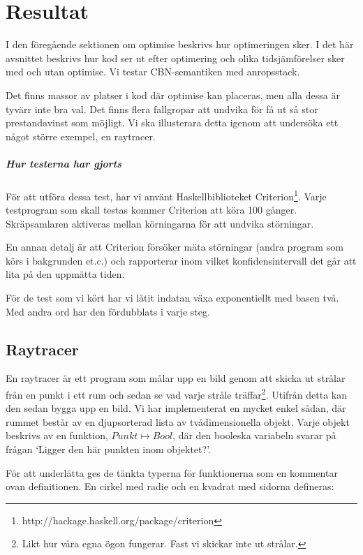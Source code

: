 \documentclass[Rapport]{subfiles}
\begin{document}
\chapter{Resultat}
\label{sec:Resultat}


I den föregående sektionen om optimise beskrivs hur optimeringen sker.
I det här avsnittet beskrivs hur kod ser ut efter optimering och 
olika tidsjämförelser sker med och utan optimise. 
Vi testar CBN-semantiken med anropsstack.

Det finns massor av platser i kod där optimise kan placeras, men alla dessa är tyvärr 
inte bra val. Det finns flera fallgropar att undvika för få ut så stor 
prestandavinst som möjligt. Vi ska illusterara detta igenom att undersöka ett 
något större exempel, en raytracer.

\paragraph{Hur testerna har gjorts}
För att utföra dessa test, har vi använt Haskellbiblioteket Criterion\footnote{http://hackage.haskell.org/package/criterion}.
Varje testprogram som skall testas kommer Criterion att köra 100 gånger. Skräpsamlaren
aktiveras mellan körningarna för att undvika störningar.

En annan detalj är att Criterion försöker mäta störningar (andra program som körs
i bakgrunden et.c.) och rapporterar inom vilket konfidensintervall det går att lita
på den uppmätta tiden.

För de test som vi kört har vi låtit indatan växa exponentiellt med basen två. Med
andra ord har den fördubblats i varje steg.

\section{Raytracer}


En raytracer är ett program som målar upp en bild genom att skicka ut strålar från en punkt
i ett rum och sedan se vad varje stråle träffar\footnote{Likt hur 
våra egna ögon fungerar. Fast vi skickar inte ut strålar.}.
Utifrån detta kan den sedan bygga upp en bild. Vi har implementerat
en mycket enkel sådan, där rummet består av en djupsorterad lista av tvådimensionella objekt.
Varje objekt beskrivs av en funktion, $Punkt \mapsto Bool$, där den booleska
variabeln svarar på frågan `Ligger den här punkten inom objektet?'.

För att underlätta ges de tänkta typerna för funktionerna som en kommentar ovan definitionen.
En cirkel med radie  och en kvadrat med sidorna  defineras:
\end{document}
